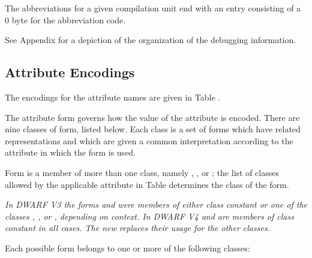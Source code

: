 The abbreviations for a given compilation unit end with an
entry consisting of a 0 byte for the abbreviation code.

See 
Appendix  
for a depiction of the organization of the
debugging information.

\subsection{Attribute Encodings}
\label{datarep:attributeencodings}

The encodings for the attribute names are given in 
Table .

The attribute form governs how the value of the attribute is
encoded. There are nine classes of form, listed below. Each
class is a set of forms which have related representations
and which are given a common interpretation according to the
attribute in which the form is used.

Form  is a member of more than one class,
namely , ,  or ; the list
of classes allowed by the applicable attribute in 
Table 
determines the class of the form.

\textit{In DWARF V3 the forms  and  were
members of either class constant or one of the classes ,
,  or , depending on context. In
DWARF V4  and  are members of class
constant in all cases. The new  replaces
their usage for the other classes.}

Each possible form belongs to one or more of the following classes:

